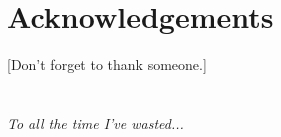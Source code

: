 \documentclass{ucalgarythesis}
\numberwithin{equation}{section}
\numberwithin{figure}{section}
\numberwithin{table}{section}
\theoremstyle{plain}
\theoremstyle{definition}
\begin{document}
 

  \chapter{Acknowledgements}  
  
    [Don't forget to thank someone.]
    

  \chapter[Dedication]{}
  
  \begin{dedication}
     \emph{To all the time I've wasted...}
  \end{dedication}

\end{document}
